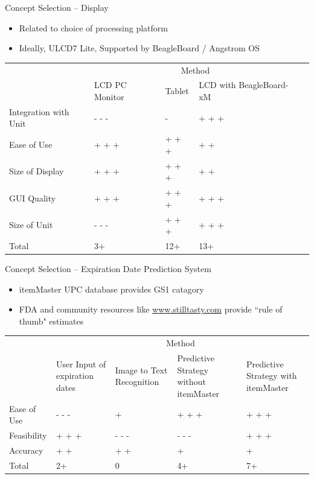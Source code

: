 \documentclass[t]{beamer}
\begin{document}
\begin{frame}{Concept Selection -- Display}
\begin{itemize}
\item Related to choice of processing platform
\item Ideally,  ULCD7 Lite, Supported by BeagleBoard / Angstrom OS
\end{itemize}
\vspace{.5cm}
\footnotesize
\begin{tabular}{| p{1.3in} | p{.7in} | p{0.7in} | p{1.0in} | p{.8in} |}
\cline{2-4}
\multicolumn{1}{c}{}&\multicolumn{3}{|c|}{Method} \\
\cline{2-4}
\multicolumn{1}{c|}{}&LCD PC \newline Monitor&Tablet&LCD with \newline BeagleBoard-xM\\
\hline
Integration with Unit&- - -&-&+ + +\\
\hline
Ease of Use&+ + +&+ + +&+ +\\
\hline
Size of Display& + + + &+ + +&+ +\\
\hline
GUI Quality&+ + +&+ + +&+ + +\\
\hline
Size of Unit&- - -&+ + +&+ + +\\
\hline
\hline
Total&3+&12+&13+\\
\hline
\end{tabular}
\end{frame}

\begin{frame}{Concept Selection -- Expiration Date Prediction System}
\begin{itemize}
\item itemMaster UPC database provides GS1 catagory
\item FDA and community resources like \url{www.stilltasty.com} provide ``rule of thumb" estimates
\end{itemize}
\vspace{.5cm}
\footnotesize
\begin{tabular}{| p{.7in} | p{.7in} | p{.8in} | p{.9in} | p{.8in} |}
\cline{2-5}
\multicolumn{1}{c}{}&\multicolumn{4}{|c|}{Method} \\
\cline{2-5}
\multicolumn{1}{c|}{}&User Input \newline of expiration \newline dates& Image to Text \newline Recognition & Predictive \newline Strategy without \newline itemMaster& Predictive \newline Strategy with \newline itemMaster \\
\hline
Ease of Use&- - -&+&+ + +&+ + +\\
\hline
Feasibility&+ + +&- - -&- - -&+ + +\\
\hline
Accuracy & + + & + + &+&+\\
\hline \hline
Total &2+ &0&4+&7+\\
\hline
\end{tabular}
\end{frame}
\end{document}
